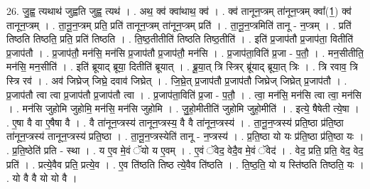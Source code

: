 \documentclass[17pt]{extarticle}
\begin{document}
26. जु॒ह्व॒ त्यथाथ॑ जुह्वति जुह्व॒ त्यथ॑ । . अथ॒ क्व॑ क्वा॑थाथ॒ क्व॑ । . क्व॑ तानून॒प्त्रम् ता॑नून॒प्त्रम् क्वा᳚(1॒) क्व॑ तानून॒प्त्रम् । . ता॒नू॒न॒प्त्रम् प्रति॒ प्रति॑ तानून॒प्त्रम् ता॑नून॒प्त्रम् प्रति॑ । . ता॒नू॒न॒प्त्रमिति॑ तानू - न॒प्त्रम् । . प्रति॑ तिष्ठति तिष्ठति॒ प्रति॒ प्रति॑ तिष्ठति । . ति॒ष्ठ॒तीतीति॑ तिष्ठति तिष्ठ॒तीति॑ । . इति॑ प्र॒जाप॑तौ प्र॒जाप॑ता॒ वितीति॑ प्र॒जाप॑तौ । . प्र॒जाप॑तौ॒ मन॑सि॒ मन॑सि प्र॒जाप॑तौ प्र॒जाप॑तौ॒ मन॑सि । . प्र॒जाप॑ता॒विति॑ प्र॒जा - प॒तौ॒ । . मन॒सीतीति॒ मन॑सि॒ मन॒सीति॑ । . इति॑ ब्रूयाद् ब्रूया॒ दितीति॑ ब्रूयात् । . ब्रू॒या॒त् त्रि स्त्रिर् ब्रू॑याद् ब्रूया॒त् त्रिः । . त्रि रवाव॒ त्रि स्त्रि रव॑ । . अव॑ जिघ्रेज् जिघ्रे॒ दवाव॑ जिघ्रेत् । . जि॒घ्रे॒त् प्र॒जाप॑तौ प्र॒जाप॑तौ जिघ्रेज् जिघ्रेत् प्र॒जाप॑तौ । . प्र॒जाप॑तौ त्वा त्वा प्र॒जाप॑तौ प्र॒जाप॑तौ त्वा । . प्र॒जाप॑ता॒विति॑ प्र॒जा - प॒तौ॒ । . त्वा॒ मन॑सि॒ मन॑सि त्वा त्वा॒ मन॑सि । . मन॑सि जुहोमि जुहोमि॒ मन॑सि॒ मन॑सि जुहोमि । . जु॒हो॒मीतीति॑ जुहोमि जुहो॒मीति॑ । . इत्ये॒ षैषेती त्ये॒षा । . ए॒षा वै वा ए॒षैषा वै । . वै ता॑नून॒प्त्रस्य॑ तानून॒प्त्रस्य॒ वै वै ता॑नून॒प्त्रस्य॑ । . ता॒नू॒न॒प्त्रस्य॑ प्रति॒ष्ठा प्र॑ति॒ष्ठा ता॑नून॒प्त्रस्य॑ तानून॒प्त्रस्य॑ प्रति॒ष्ठा । . ता॒नू॒न॒प्त्रस्येति॑ तानू - न॒प्त्रस्य॑ । . प्र॒ति॒ष्ठा यो यः प्र॑ति॒ष्ठा प्र॑ति॒ष्ठा यः । . प्र॒ति॒ष्ठेति॑ प्रति - स्था । . य ए॒व मे॒वं ॅयो य ए॒वम् । . ए॒वं ॅवेद॒ वेदै॒व मे॒वं ॅवेद॑ । . वेद॒ प्रति॒ प्रति॒ वेद॒ वेद॒ प्रति॑ । . प्रत्ये॒वैव प्रति॒ प्रत्ये॒व । . ए॒व ति॑ष्ठति तिष्ठ त्ये॒वैव ति॑ष्ठति । . ति॒ष्ठ॒ति॒ यो य स्ति॑ष्ठति तिष्ठति॒ यः । . यो वै वै यो यो वै । \newline
\end{document}
